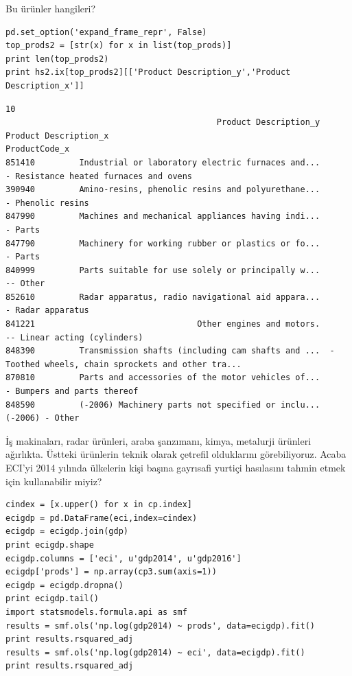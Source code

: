 \documentclass[12pt,fleqn]{article}\usepackage{../../common}
\begin{document}
Bu ürünler hangileri?

\begin{verbatim}
pd.set_option('expand_frame_repr', False)
top_prods2 = [str(x) for x in list(top_prods)]
print len(top_prods2)
print hs2.ix[top_prods2][['Product Description_y','Product Description_x']]
\end{verbatim}

\begin{verbatim}
10
                                           Product Description_y                              Product Description_x
ProductCode_x                                                                                                      
851410         Industrial or laboratory electric furnaces and...             - Resistance heated furnaces and ovens
390940         Amino-resins, phenolic resins and polyurethane...                                  - Phenolic resins
847990         Machines and mechanical appliances having indi...                                            - Parts
847790         Machinery for working rubber or plastics or fo...                                            - Parts
840999         Parts suitable for use solely or principally w...                                           -- Other
852610         Radar apparatus, radio navigational aid appara...                                  - Radar apparatus
841221                                 Other engines and motors.                       -- Linear acting (cylinders)
848390         Transmission shafts (including cam shafts and ...  -Toothed wheels, chain sprockets and other tra...
870810         Parts and accessories of the motor vehicles of...                        - Bumpers and parts thereof
848590         (-2006) Machinery parts not specified or inclu...                                    (-2006) - Other
\end{verbatim}

İş makinaları, radar ürünleri, araba şanzımanı, kimya, metalurji ürünleri
ağırlıkta. Üstteki ürünlerin teknik olarak çetrefil olduklarını
görebiliyoruz. Acaba ECI'yi 2014 yılında ülkelerin kişi başına gayrısafi
yurtiçi hasılasını tahmin etmek için kullanabilir miyiz?

\begin{verbatim}
cindex = [x.upper() for x in cp.index]
ecigdp = pd.DataFrame(eci,index=cindex)
ecigdp = ecigdp.join(gdp)
print ecigdp.shape
ecigdp.columns = ['eci', u'gdp2014', u'gdp2016']
ecigdp['prods'] = np.array(cp3.sum(axis=1))
ecigdp = ecigdp.dropna()
print ecigdp.tail()
import statsmodels.formula.api as smf
results = smf.ols('np.log(gdp2014) ~ prods', data=ecigdp).fit()
print results.rsquared_adj
results = smf.ols('np.log(gdp2014) ~ eci', data=ecigdp).fit()
print results.rsquared_adj
\end{verbatim}
\end{document}
